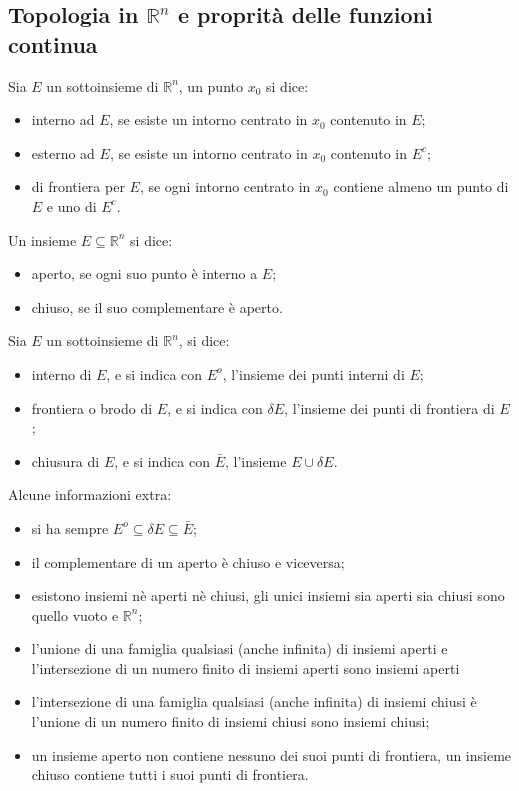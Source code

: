 \subsection*{Topologia in $\mathbb{R}^n$ e proprità delle funzioni continua}
Sia $E$ un sottoinsieme di $\mathbb{R}^n$, un punto $x_0$ si dice:
\begin{itemize}
    \item interno ad $E$, se esiste un intorno centrato in $x_0$ contenuto in $E$;
    \item esterno ad $E$, se esiste un intorno centrato in $x_0$ contenuto in $E^c$;
    \item di frontiera per $E$, se ogni intorno centrato in $x_0$ contiene almeno un punto di $E$ e uno di $E^c$.
\end{itemize}
Un insieme $E \subseteq \mathbb{R}^n$ si dice:
\begin{itemize}
    \item aperto, se ogni suo punto è interno a $E$;
    \item chiuso, se il suo complementare è aperto.
\end{itemize} 
Sia $E$ un sottoinsieme di $\mathbb{R}^n$, si dice:
\begin{itemize}
    \item interno di $E$, e si indica con $E^o$, l'insieme dei punti interni di $E$;
    \item frontiera o brodo di $E$, e si indica con $\delta E$, l'insieme dei punti di frontiera di $E$;
    \item chiusura di $E$, e si indica con $\bar{E}$, l'insieme $E \cup \delta E$.
\end{itemize}
Alcune informazioni extra: 
\begin{itemize}
    \item si ha sempre $E^o \subseteq \delta E \subseteq \bar{E}$;
    \item il complementare di un aperto è chiuso e viceversa; 
    \item esistono insiemi nè aperti nè chiusi, gli unici insiemi sia aperti sia chiusi sono quello vuoto e $\mathbb{R}^n$;
    \item l'unione di una famiglia qualsiasi (anche infinita) di insiemi aperti e l'intersezione di un numero finito di insiemi aperti sono insiemi aperti 
    \item l'intersezione di una famiglia qualsiasi (anche infinita) di insiemi chiusi è l'unione di un numero finito di insiemi chiusi sono insiemi chiusi;
    \item un insieme aperto non contiene nessuno dei suoi punti di frontiera, un insieme chiuso contiene tutti i suoi punti di frontiera.
\end{itemize}
